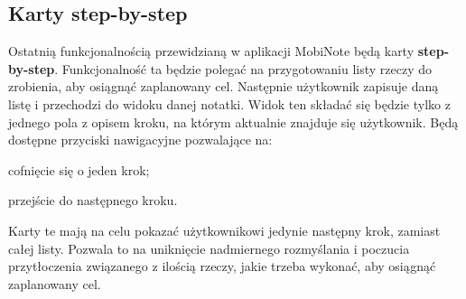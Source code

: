 \subsection{Karty step-by-step}

Ostatnią funkcjonalnością przewidzianą w aplikacji MobiNote będą karty \textbf{step-by-step}.
Funkcjonalność ta będzie polegać na przygotowaniu listy rzeczy do zrobienia, aby osiągnąć zaplanowany cel. Następnie użytkownik zapisuje daną listę i przechodzi do widoku danej notatki. Widok ten składać się będzie tylko z jednego pola z opisem kroku, na którym aktualnie znajduje się użytkownik. Będą dostępne przyciski nawigacyjne pozwalające na:
\begin{compactitem}
    \item cofnięcie się o jeden krok;
    \item przejście do następnego kroku.
    
\end{compactitem}

Karty te mają na celu pokazać użytkownikowi jedynie następny krok, zamiast całej listy. Pozwala to na uniknięcie nadmiernego rozmyślania i poczucia przytłoczenia związanego z ilością rzeczy, jakie trzeba wykonać, aby osiągnąć zaplanowany cel.